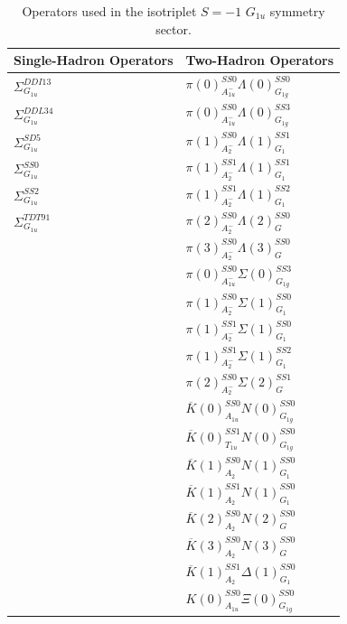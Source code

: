 \begin{table}
    \centering
    \begin{tabular}{l|l}
        \textbf{Single-Hadron Operators} & \textbf{Two-Hadron Operators} \\
        \hline
        $\Sigma_{G_{1u}}^{DDI13}$ & $\pi(0)_{A_{1u}^-}^{SS0}\Lambda(0)_{G_{1g}}^{SS0}$\\
        $\Sigma_{G_{1u}}^{DDL34}$ & $\pi(0)_{A_{1u}^-}^{SS0}\Lambda(0)_{G_{1g}}^{SS3}$\\
        $\Sigma_{G_{1u}}^{SD5}$ & $\pi(1)_{A_2^-}^{SS0}\Lambda(1)_{G_1}^{SS1}$\\
        $\Sigma_{G_{1u}}^{SS0}$ & $\pi(1)_{A_2^-}^{SS1}\Lambda(1)_{G_1}^{SS1}$\\
        $\Sigma_{G_{1u}}^{SS2}$ & $\pi(1)_{A_2^-}^{SS1}\Lambda(1)_{G_1}^{SS2}$\\
        $\Sigma_{G_{1u}}^{TDT91}$ & $\pi(2)_{A_2^-}^{SS0}\Lambda(2)_{G}^{SS0}$\\
         & $\pi(3)_{A_2^-}^{SS0}\Lambda(3)_{G}^{SS0}$\\
         & $\pi(0)_{A_{1u}^-}^{SS0}\Sigma(0)_{G_{1g}}^{SS3}$\\
         & $\pi(1)_{A_2^-}^{SS0}\Sigma(1)_{G_1}^{SS0}$\\
         & $\pi(1)_{A_2^-}^{SS1}\Sigma(1)_{G_1}^{SS0}$\\
         & $\pi(1)_{A_2^-}^{SS1}\Sigma(1)_{G_1}^{SS2}$\\
         & $\pi(2)_{A_2^-}^{SS0}\Sigma(2)_{G}^{SS1}$\\
         & $\overline K(0)_{A_{1u}}^{SS0}N(0)_{G_{1g}}^{SS0}$\\
         & $\overline K(0)_{T_{1u}}^{SS1}N(0)_{G_{1g}}^{SS0}$\\
         & $\overline K(1)_{A_2}^{SS0}N(1)_{G_1}^{SS0}$\\
         & $\overline K(1)_{A_2}^{SS1}N(1)_{G_1}^{SS0}$\\
         & $\overline K(2)_{A_2}^{SS0}N(2)_{G}^{SS0}$\\
         & $\overline K(3)_{A_2}^{SS0}N(3)_{G}^{SS0}$\\
         & $\overline K(1)_{A_2}^{SS1}\Delta(1)_{G_1}^{SS0}$\\
         & $K(0)_{A_{1u}}^{SS0}\Xi(0)_{G_{1g}}^{SS0}$        
    \end{tabular}
    \caption{Operators used in the isotriplet $S=-1$ $G_{1u}$ symmetry sector.}\label{table:g1u_ops}
\end{table}

